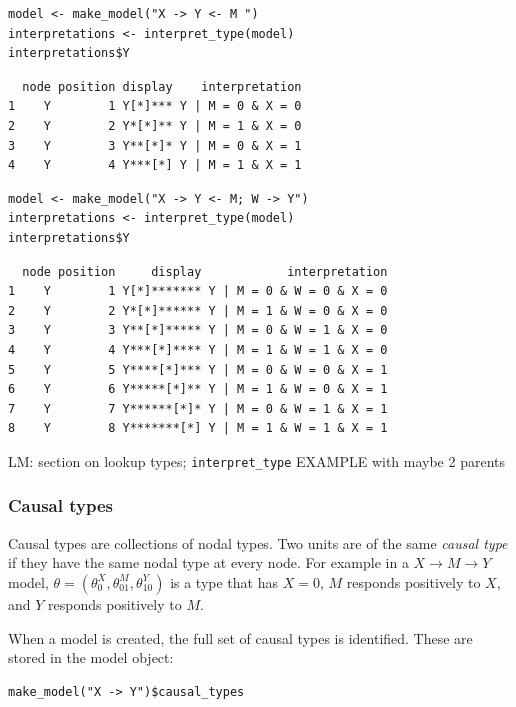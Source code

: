 \documentclass[
  article]{jss}
\begin{document}
\begin{verbatim}
model <- make_model("X -> Y <- M ")
interpretations <- interpret_type(model)
interpretations$Y
\end{verbatim}

\begin{verbatim}
  node position display    interpretation
1    Y        1 Y[*]*** Y | M = 0 & X = 0
2    Y        2 Y*[*]** Y | M = 1 & X = 0
3    Y        3 Y**[*]* Y | M = 0 & X = 1
4    Y        4 Y***[*] Y | M = 1 & X = 1
\end{verbatim}

\begin{verbatim}
model <- make_model("X -> Y <- M; W -> Y")
interpretations <- interpret_type(model)
interpretations$Y
\end{verbatim}

\begin{verbatim}
  node position     display            interpretation
1    Y        1 Y[*]******* Y | M = 0 & W = 0 & X = 0
2    Y        2 Y*[*]****** Y | M = 1 & W = 0 & X = 0
3    Y        3 Y**[*]***** Y | M = 0 & W = 1 & X = 0
4    Y        4 Y***[*]**** Y | M = 1 & W = 1 & X = 0
5    Y        5 Y****[*]*** Y | M = 0 & W = 0 & X = 1
6    Y        6 Y*****[*]** Y | M = 1 & W = 0 & X = 1
7    Y        7 Y******[*]* Y | M = 0 & W = 1 & X = 1
8    Y        8 Y*******[*] Y | M = 1 & W = 1 & X = 1
\end{verbatim}

LM: section on lookup types; \texttt{interpret\_type} EXAMPLE with maybe
2 parents

\hypertarget{causal-types}{%
\subsubsection{Causal types}\label{causal-types}}

Causal types are collections of nodal types. Two units are of the same
\emph{causal type} if they have the same nodal type at every node. For
example in a \(X \rightarrow M \rightarrow Y\) model,
\(\theta = (\theta^X_0, \theta^M_{01}, \theta^Y_{10})\) is a type that
has \(X=0\), \(M\) responds positively to \(X\), and \(Y\) responds
positively to \(M\).

When a model is created, the full set of causal types is identified.
These are stored in the model object:

\begin{verbatim}
make_model("X -> Y")$causal_types
\end{verbatim}
\end{document}
